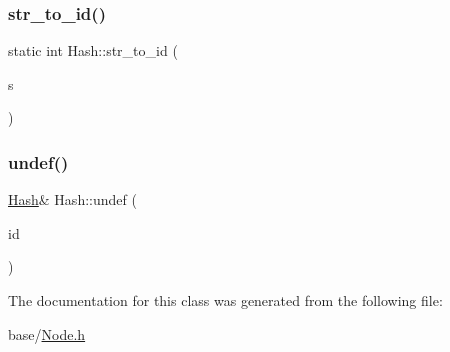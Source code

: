 \mbox{\label{classHash_abf1b1f76adfd20925d2d0b4c4b8d5a8f}} 
\subsubsection{\texorpdfstring{str\+\_\+to\+\_\+id()}{str\_to\_id()}}
{\footnotesize\ttfamily static int Hash\+::str\+\_\+to\+\_\+id (\begin{DoxyParamCaption}\item[{\mbox{\hyperlink{Node_8h_a0d7591b97fcccd83c3c2ce469c8bc25c}{n\+Str}}}]{s }\end{DoxyParamCaption})\hspace{0.3cm}{\ttfamily [static]}}

\mbox{\label{classHash_ab012231e2ae6d2cac49dfd817a247a96}} 
\subsubsection{\texorpdfstring{undef()}{undef()}}
{\footnotesize\ttfamily \mbox{\hyperlink{classHash}{Hash}}\& Hash\+::undef (\begin{DoxyParamCaption}\item[{int}]{id }\end{DoxyParamCaption})}



The documentation for this class was generated from the following file\+:\begin{DoxyCompactItemize}
\item 
base/\mbox{\hyperlink{Node_8h}{Node.\+h}}\end{DoxyCompactItemize}
